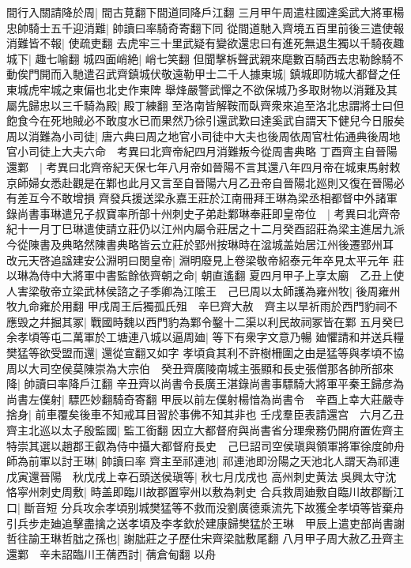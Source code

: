 間行入關請降於周|{
	間古莧翻下間道同降戶江翻}
三月甲午周遣柱國達奚武大將軍楊忠帥騎士五千迎消難|{
	帥讀曰率騎奇寄翻下同}
從間道馳入齊境五百里前後三遣使報消難皆不報|{
	使疏吏翻}
去虎牢三十里武疑有變欲還忠曰有進死無退生獨以千騎夜趣城下|{
	趣七喻翻}
城四面峭絶|{
	峭七笑翻}
但聞擊柝聲武親來麾數百騎西去忠勒餘騎不動俟門開而入馳遣召武齊鎮城伏敬遠勒甲士二千人據東城|{
	鎮城即防城大都督之任東城虎牢城之東偏也北史作東陴}
舉烽嚴警武憚之不欲保城乃多取財物以消難及其屬先歸忠以三千騎為殿|{
	殿丁練翻}
至洛南皆解鞍而臥齊衆來追至洛北忠謂將士曰但飽食今在死地賊必不敢度水已而果然乃徐引還武歎曰達奚武自謂天下健兒今日服矣周以消難為小司徒|{
	唐六典曰周之地官小司徒中大夫也後周依周官杜佑通典後周地官小司徒上大夫六命　考異曰北齊帝紀四月消難叛今從周書典略}
丁酉齊主自晉陽還鄴　|{
	考異曰北齊帝紀天保七年八月帝如晉陽不言其還八年四月帝在城東馬射敕京師婦女悉赴觀是在鄴也此月又言至自晉陽六月乙丑帝自晉陽北廵則又復在晉陽必有差互今不敢增損}
齊發兵援送梁永嘉王莊於江南冊拜王琳為梁丞相都督中外諸軍錄尚書事琳遣兄子叔寶率所部十州刺史子弟赴鄴琳奉莊即皇帝位　|{
	考異曰北齊帝紀十一月丁巳琳遣使請立莊仍以江州内屬令莊居之十二月癸酉詔莊為梁主進居九派今從陳書及典略然陳書典略皆云立莊於郢州按琳時在湓城盖始居江州後遷郢州耳}
改元天啓追諡建安公淵明曰閔皇帝|{
	淵明廢見上卷梁敬帝紹泰元年卒見太平元年}
莊以琳為侍中大將軍中書監餘依齊朝之命|{
	朝直遙翻}
夏四月甲子上享太廟　乙丑上使人害梁敬帝立梁武林侯諮之子季卿為江隂王　己巳周以太師護為雍州牧|{
	後周雍州牧九命雍於用翻}
甲戌周王后獨孤氏殂　辛巳齊大赦　齊主以旱祈雨於西門豹祠不應毁之幷掘其冢|{
	戰國時魏以西門豹為鄴令鑿十二渠以利民故祠冢皆在鄴}
五月癸巳余孝頃等屯二萬軍於工塘連八城以逼周廸|{
	等下有衆字文意乃暢}
廸懼請和并送兵糧樊猛等欲受盟而還|{
	還從宣翻又如字}
孝頃貪其利不許樹柵圍之由是猛等與孝頃不協　周以大司空侯莫陳崇為大宗伯　癸丑齊廣陵南城主張顯和長史張僧那各帥所部來降|{
	帥讀曰率降戶江翻}
辛丑齊以尚書令長廣王湛錄尚書事驃騎大將軍平秦王歸彦為尚書左僕射|{
	驃匹妙翻騎奇寄翻}
甲辰以前左僕射楊愔為尚書令　辛酉上幸大莊嚴寺捨身|{
	前車覆矣後車不知戒耳目習於事佛不知其非也}
壬戌羣臣表請還宫　六月乙丑齊主北巡以太子殷監國|{
	監工銜翻}
因立大都督府與尚書省分理衆務仍開府置佐齊主特崇其選以趙郡王叡為侍中攝大都督府長史　己巳詔司空侯瑱與領軍將軍徐度帥舟師為前軍以討王琳|{
	帥讀曰率}
齊主至祁連池|{
	祁連池即汾陽之天池北人謂天為祁連}
戊寅還晉陽　秋戊戌上幸石頭送侯瑱等|{
	秋七月戊戌也}
高州刺史黄法吳興太守沈恪寜州刺史周敷|{
	時盖即臨川故郡置寜州以敷為刺史}
合兵救周廸敷自臨川故郡斷江口|{
	斷音短}
分兵攻余孝頃别城樊猛等不救而没劉廣德乘流先下故獲全孝頃等皆棄舟引兵步走廸追擊盡擒之送孝頃及李孝欽於建康歸樊猛於王琳　甲辰上遣吏部尚書謝哲往諭王琳哲朏之孫也|{
	謝朏莊之子歷仕宋齊梁朏敷尾翻}
八月甲子周大赦乙丑齊主還鄴　辛未詔臨川王蒨西討|{
	蒨倉甸翻}
以舟

